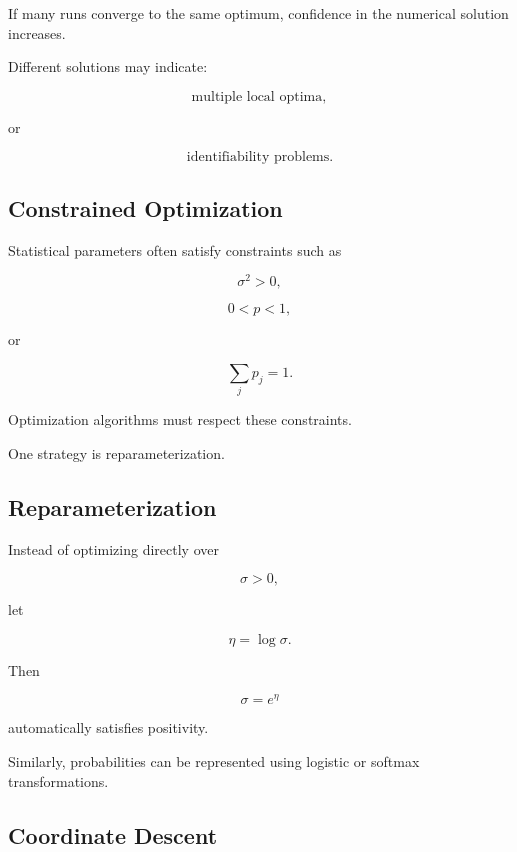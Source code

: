 If many runs converge to the same optimum, confidence in the numerical
solution increases.

Different solutions may indicate:

\[
\boxed{
\text{multiple local optima},
}
\]

or

\[
\boxed{
\text{identifiability problems}.
}
\]

\subsection{Constrained Optimization}
\label{subsec:constrained-optimization-statistics}

Statistical parameters often satisfy constraints such as

\[
\boxed{
\sigma^2>0,
}
\]

\[
\boxed{
0<p<1,
}
\]

or

\[
\boxed{
\sum_jp_j=1.
}
\]

Optimization algorithms must respect these constraints.

One strategy is reparameterization.

\subsection{Reparameterization}
\label{subsec:optimization-reparameterization}

Instead of optimizing directly over

\[
\sigma>0,
\]

let

\[
\boxed{
\eta
=
\log\sigma.
}
\]

Then

\[
\boxed{
\sigma
=
e^\eta
}
\]

automatically satisfies positivity.

Similarly, probabilities can be represented using logistic or softmax
transformations.

\subsection{Coordinate Descent}
\label{subsec:coordinate-descent}

